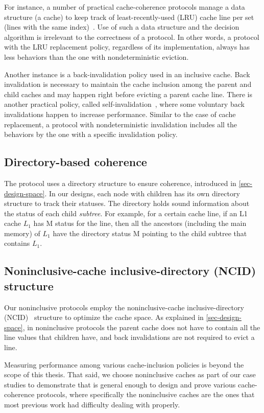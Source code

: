 For instance, a number of practical cache-coherence protocols manage a data structure (a cache) to keep track of least-recently-used (LRU) cache line per set (lines with the same index)~\cite{cacheLRU}.
Use of such a data structure and the decision algorithm is irrelevant to the correctness of a protocol.
In other words, a protocol with the LRU replacement policy, regardless of its implementation, always has less behaviors than the one with nondeterministic eviction.

Another instance is a back-invalidation policy used in an inclusive cache.
Back invalidation is necessary to maintain the cache inclusion among the parent and child caches and may happen right before evicting a parent cache line.
There is another practical policy, called self-invalidation~\cite{Ros:2012}, where some voluntary back invalidations happen to increase performance.
Similar to the case of cache replacement, a protocol with nondeterministic invalidation includes all the behaviors by the one with a specific invalidation policy.

\subsection{Directory-based coherence}
\label{sec-dir-based}

The protocol uses a directory structure to ensure coherence, introduced in \autoref{sec-design-space}.
In our designs, each node with children has its own directory structure to track their statuses.
The directory holds sound information about the status of each child \emph{subtree}.
For example, for a certain cache line, if an L1 cache $L_1$ has M status for the line, then all the ancestors (including the main memory) of $L_1$ have the directory status M pointing to the child subtree that contains $L_1$.

\subsection{Noninclusive-cache inclusive-directory (NCID) structure}
\label{sec-inc-noninc}

Our noninclusive protocols employ the noninclusive-cache inclusive-directory (NCID)~\cite{Zhao:2010} structure to optimize the cache space.
As explained in \autoref{sec-design-space}, in noninclusive protocols the parent cache does not have to contain all the line values that children have, and back invalidations are not required to evict a line.

Measuring performance among various cache-inclusion policies is beyond the scope of this thesis.
That said, we choose noninclusive caches as part of our case studies to demonstrate that \hemiola{} is general enough to design and prove various cache-coherence protocols, where specifically the noninclusive caches are the ones that most previous work had difficulty dealing with properly.


